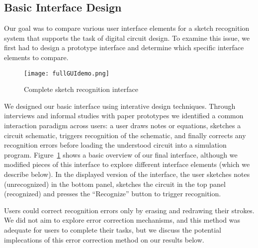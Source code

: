 \documentclass{egpubl}
\begin{document}
\subsection{Basic Interface Design}
Our goal was to compare various user interface elements for a sketch
recognition system that supports the task of digital circuit
design. To examine this issue, we first had to design a prototype
interface and determine which specific interface elements to compare.

\begin{figure}[tb]
  \centering
  \texttt{[image: fullGUIdemo.png]}
  \label{fig:fullGUIdemo}
  \caption{
           Complete sketch recognition interface }
\end{figure}

We designed our basic interface using interative design techniques.
Through interviews and informal studies with paper prototypes we
identified a common interaction paradigm across users: a user draws
notes or equations, sketches a circuit schematic, triggers recognition
of the schematic, and finally corrects any recognition errors before
loading the understood circuit into a simulation program.
Figure~\ref{fig:fullGUIdemo} shows a basic overview of our final
interface, although we modified pieces of this interface to explore
different interface elements (which we describe below).  In the
displayed version of the interface, the user sketches notes (unrecognized)
in the bottom panel, sketches the circuit in the top panel
(recognized) and presses the ``Recognize'' button to trigger
recognition.  

Users could correct recognition errors only by erasing and redrawing
their strokes.  We did not aim to explore error correction mechanisms,
and this method was adequate for users to complete their tasks, but we
discuss the potential implecations of this error correction method on
our results below.




\end{document}
